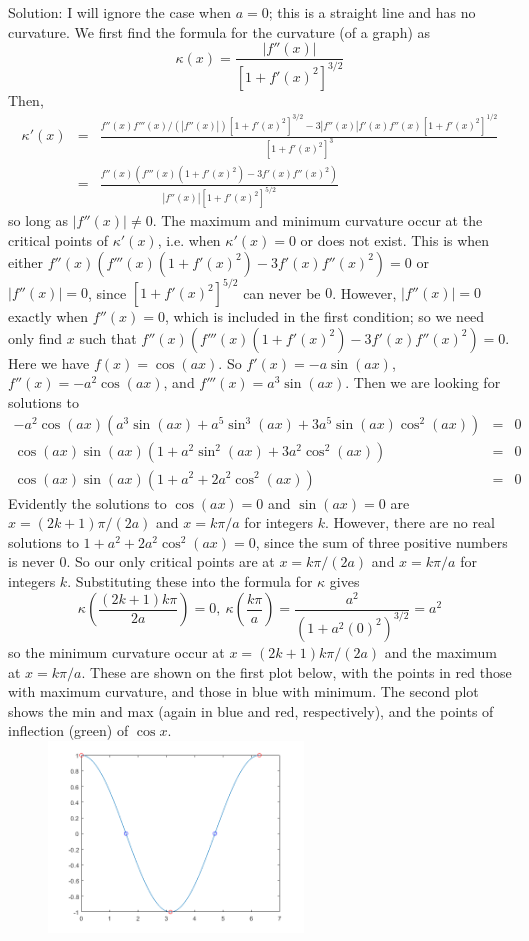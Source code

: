 \documentclass[12pt]{amsbook}
\begin{document}
\\
\\
{\sc Solution}: I will ignore the case when $a=0$; this is a straight line and has no curvature. We first find the formula for the curvature (of a graph) as 
$$\kappa(x)=\frac{|f''(x)|}{[1+f'(x)^2]^{3/2}}$$
Then,
\begin{eqnarray*}
\kappa'(x)&=&\frac{f''(x)f'''(x)/(|f''(x)|)[1+f'(x)^2]^{3/2}-3|f''(x)|f'(x)f''(x)[1+f'(x)^2]^{1/2}}{[1+f'(x)^2]^{3}} \\
&=&\frac{f''(x)(f'''(x)(1+f'(x)^2)-3f'(x)f''(x)^2)}{|f''(x)|[1+f'(x)^2]^{5/2}}
\end{eqnarray*}
so long as $|f''(x)| \neq 0$. The maximum and minimum curvature occur at the critical points of $\kappa'(x)$, i.e. when $\kappa'(x)=0$ or does not exist. This is when either $f''(x)(f'''(x)(1+f'(x)^2)-3f'(x)f''(x)^2)=0$ or $|f''(x)|=0$, since $[1+f'(x)^2]^{5/2}$ can never be $0$. However, $|f''(x)|=0$ exactly when $f''(x)=0$, which is included in the first condition; so we need only find $x$ such that $f''(x)(f'''(x)(1+f'(x)^2)-3f'(x)f''(x)^2)=0$. 
\\
Here we have $f(x)=\cos(ax)$. So $f'(x)=-a\sin(ax)$, $f''(x)=-a^2\cos(ax)$, and $f'''(x)=a^3\sin(ax)$. Then we are looking for solutions to
\begin{eqnarray*}
-a^2\cos(ax)(a^3\sin(ax)+a^5\sin^3(ax)+3a^5\sin(ax)\cos^2(ax))&=&0\\
\cos(ax)\sin(ax)(1+a^2\sin^2(ax)+3a^2\cos^2(ax))&=&0 \\
\cos(ax)\sin(ax)(1+a^2+2a^2\cos^2(ax))&=&0
\end{eqnarray*}
Evidently the solutions to $\cos(ax)=0$ and $\sin(ax)=0$ are $x=(2k+1)\pi/(2a)$ and $x=k\pi/a$ for integers $k$. However, there are no real solutions to $1+a^2+2a^2\cos^2(ax)=0$, since the sum of three positive numbers is never 0. So our only critical points are at $x=k\pi/(2a)$ and $x=k\pi/a$ for integers $k$. Substituting these into the formula for $\kappa$ gives
$$\kappa(\frac{(2k+1)k\pi}{2a})=0, \ \kappa(\frac{k\pi}{a})=\frac{a^2}{(1+a^2(0)^2)^{3/2}}=a^2$$
so the minimum curvature occur at $x=(2k+1)k\pi/(2a)$ and the maximum at $x=k\pi/a$. These are shown on the first plot below, with the points in red those with maximum curvature, and those in blue with minimum. The second plot shows the min and max (again in blue and red, respectively), and the points of inflection (green) of $\cos x$.
\\
\includegraphics[width=3.5in,height=2.0in]{2_14_12_1.png}
\end{document}
